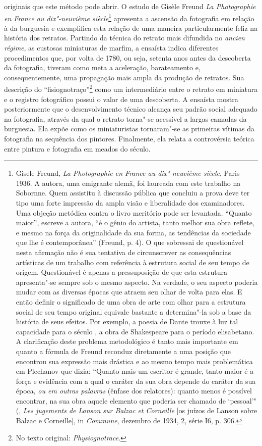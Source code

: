 originais que este método pode abrir. O estudo de Gisèle Freund \emph{La
Photographie en France au dix"-neuvième siècle}\footnote{Gisele Freund,
  \emph{La Photographie en France au dix"-neuvième siècle}, Paris 1936. A
  autora, uma emigrante alemã, foi laureada com este trabalho na
  Sobornne. Quem assistitu à discussão pública que concluiu a prova deve
  ter tipo uma forte impressão da ampla visão e liberalidade dos
  examinadores. Uma objeção metódica contra o livro meritório pode ser
  levantada. ``Quanto maior'', escreve a autora, ``é o gênio do artista,
  tanto melhor sua obra reflete, e mesmo na força da originalidade da
  sua forma, as tendências da sociedade que lhe é contemporânea''
  (Freund, p. 4). O que sobressai de questionável nesta afirmação não é
  sua tentativa de circunscrever as consequências artísticas de um
  trabalho com referência à estrutura social de seu tempo de origem.
  Questionável é apenas a pressuposição de que esta estrutura
  apresenta"-se sempre sob o mesmo aspecto. Na verdade, o seu aspecto
  poderia mudar com as diversas épocas que atraem seu olhar de volta
  para elas. E então definir o significado de uma obra de arte com olhar
  para a estrutura social de seu tempo original equivale bastante a
  determina"-la sob a base da história de seus efeitos. Por exemplo, a
  poesia de Dante trouxe à luz tal capacidade para o século , a obra
  de Shakespeare para o período elisabetano. A clarificação deste
  problema metodológico é tanto mais importante em quanto a fórmula de
  Freund reconduz diretamente a uma posição que encontrou sua
  expressão mais drástica e ao mesmo tempo mais problemática em
  Plechanov que dizia: ``Quanto mais um escritor é grande, tanto maior é
  a força e evidência com a qual o caráter da sua obra depende do
  caráter da sua época, \emph{ou em outras palavras} (ênfase dos
  relatores): quanto menos é possível encontrar, na sua obra aquele
  elemento que poderia ser chamado de `pessoal'" (,
  \emph{Les jugements de Lanson sur Balzac et Corneille} {[}os juízos de
  Lanson sobre Balzac e Corneille{]}, in \emph{Commune}, dezembro de
  1934, 2, série I6, p. 306.} apresenta a ascensão da fotografia em
relação à da burguesia e exemplifica esta relação de uma maneira
particularmente feliz na história dos retratos. Partindo da técnica do
retrato mais difundida no \emph{ancien régime}, as custosas miniaturas
de marfim, a ensaísta indica diferentes procedimentos que, por volta de
1780, ou seja, setenta anos antes da descoberta da fotografia, tiveram
como meta a aceleração, barateamento e, consequentemente, uma propagação
mais ampla da produção de retratos. Sua descrição do
``fisiognotraço''\footnote{No texto original:
  \emph{Physiognotrace}. \versal{[N. T.]}} como um intermediário entre o retrato em
miniatura e o registro fotográfico possui o valor de uma descoberta. A
ensaísta mostra posteriormente que o desenvolvimento técnico alcança seu
padrão social adequado na fotografia, através da qual o retrato torna"-se
acessível a largas camadas da burguesia. Ela expõe como os miniaturistas
tornaram"-se as primeiras vítimas da fotografia na sequência dos
pintores. Finalmente, ela relata a controvérsia teórica entre pintura e
fotografia em meados do século.


